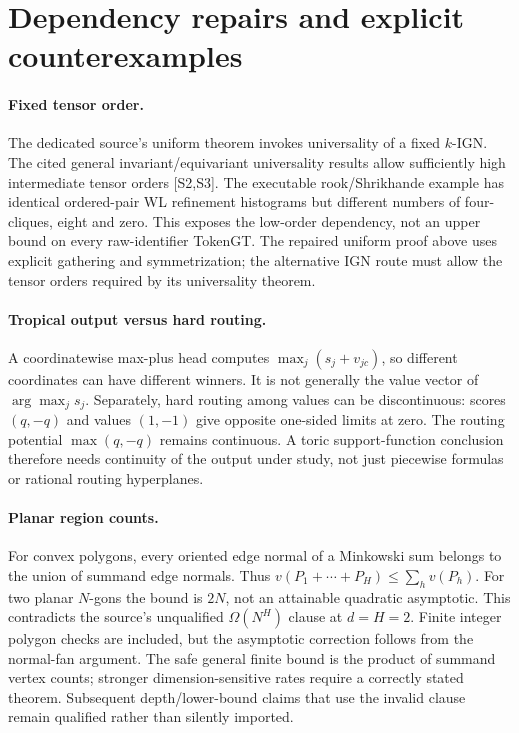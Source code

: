 \section{Dependency repairs and explicit counterexamples}

\paragraph{Fixed tensor order.} The dedicated source's uniform theorem invokes universality of a fixed $k$-IGN. The cited general invariant/equivariant universality results allow sufficiently high intermediate tensor orders [S2,S3]. The executable rook/Shrikhande example has identical ordered-pair WL refinement histograms but different numbers of four-cliques, eight and zero. This exposes the low-order dependency, not an upper bound on every raw-identifier TokenGT. The repaired uniform proof above uses explicit gathering and symmetrization; the alternative IGN route must allow the tensor orders required by its universality theorem.

\paragraph{Tropical output versus hard routing.} A coordinatewise max-plus head computes $\max_j(s_j+v_{jc})$, so different coordinates can have different winners. It is not generally the value vector of $\arg\max_j s_j$. Separately, hard routing among values can be discontinuous: scores $(q,-q)$ and values $(1,-1)$ give opposite one-sided limits at zero. The routing potential $\max(q,-q)$ remains continuous. A toric support-function conclusion therefore needs continuity of the output under study, not just piecewise formulas or rational routing hyperplanes.

\paragraph{Planar region counts.} For convex polygons, every oriented edge normal of a Minkowski sum belongs to the union of summand edge normals. Thus $v(P_1+\cdots+P_H)\le\sum_hv(P_h)$. For two planar $N$-gons the bound is $2N$, not an attainable quadratic asymptotic. This contradicts the source's unqualified $\Omega(N^H)$ clause at $d=H=2$. Finite integer polygon checks are included, but the asymptotic correction follows from the normal-fan argument. The safe general finite bound is the product of summand vertex counts; stronger dimension-sensitive rates require a correctly stated theorem. Subsequent depth/lower-bound claims that use the invalid clause remain qualified rather than silently imported.


